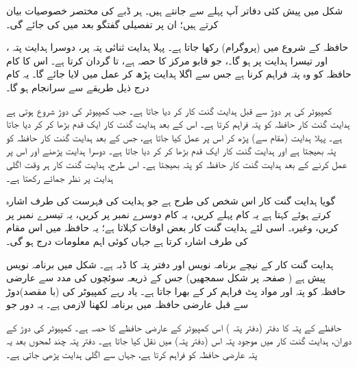 شکل  میں پیش کئی دفاتر  آپ پہلے سے  جانتے ہیں۔  ہر ڈبے کی مختصر  خصوصیات بیان کرتے ہیں؛ ان پر تفصیلی گفتگو بعد میں کی جائے گی۔

حافظہ  کے شروع میں (پروگرام)  رکھا جاتا ہے۔ پہلا ہدایت ثنائی پتہ  پر، دوسرا ہدایت پتہ ، اور تیسرا ہدایت  پر ہو گا۔،  جو قابو مرکز کا حصہ ہے،  تا  گردان کرتا ہے۔ اس کا کام حافظہ کو وہ پتہ فراہم کرنا ہے جس سے اگلا ہدایت پڑھ کر عمل میں لایا جائے گا۔ یہ کام درج ذیل طریقے سے سرانجام ہو گا۔

کمپیوٹر کی ہر دوڑ  سے قبل ہدایت گنت کار     کر دیا جاتا ہے۔ جب کمپیوٹر کی دوڑ شروع  ہوتی ہے ہدایت گنت کار   حافظہ کو پتہ  فراہم کرتا ہے۔ اس کے بعد ہدایت گنت کار   ایک قدم بڑھا کر   کر دیا جاتا ہے۔ پہلا ہدایت (مقام  سے) پڑھ کر اس پر عمل کیا جاتا ہے، جس کے بعد ہدایت گنت کار حافظہ کو پتہ  بھیجتا ہے اور   ہدایت گنت کار ایک قدم بڑھا کر  کر دیا جاتا ہے۔ دوسرا ہدایت پڑھنے اور اس پر عمل کرنے کے بعد ہدایت گنت کار حافظہ کو  پتہ بھیجتا ہے۔ اس طرح، ہدایت گنت کار ہر وقت اگلی  ہدایت  پر نظر جمائے رکھتا ہے۔

گویا ہدایت گنت کار اس شخص کی طرح ہے جو ہدایت کی فہرست  کی طرف اشارہ کرتے ہوئے کہتا ہے یہ کام  پہلے کریں، یہ کام دوسرے نمبر پر کریں، یہ تیسرے نمبر پر کریں، وغیرہ۔ اسی لئے ہدایت گنت کار بعض اوقات  کہلاتا ہے؛ یہ حافظہ میں اس مقام کی طرف اشارہ کرتا ہے جہاں کوئی   اہم معلومات درج ہو گی۔

ہدایت گنت کار کے نیچے برنامہ نویس   اور دفتر پتہ کا  ڈبہ ہے۔ شکل  میں برنامہ نویس پیش ہے (     صفحہ  پر شکل  سمجھیں)   جس  کے ذریعہ سوئچوں  کی مدد سے   عارضی حافظہ کو   پتہ اور  مواد   بِٹ فراہم کر  کے بھرا جاتا ہے۔ یاد رہے کمپیوٹر کی  (با مقصد)دوڑ سے قبل عارضی حافظہ میں برنامہ  لکھنا لازمی ہے۔ یہ دور جو 

حافظے کے پتہ  کا دفتر  (دفتر پتہ  )  اس کمپیوٹر کے عارضی حافظے کا حصہ ہے۔ کمپیوٹر  کی دوڑ کے دوران، ہدایت گنت کار  میں موجود پتہ  اس   (دفتر پتہ)     میں نقل  کیا جاتا ہے۔  دفتر پتہ   چند لمحوں بعد یہ پتہ عارضی  حافظہ کو فراہم کرتا ہے، جہاں سے   اگلی ہدایت پڑھی جاتی ہے۔

